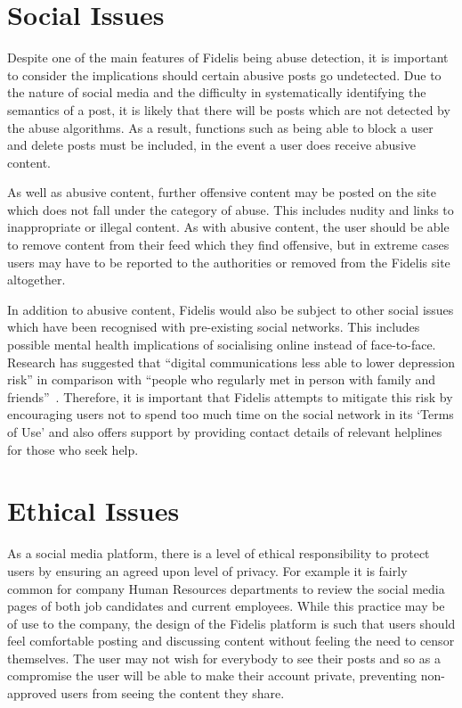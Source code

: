 \section{Social Issues}
Despite one of the main features of Fidelis being abuse detection, it is important to consider the implications should certain abusive posts go undetected. Due to the nature of social media and the difficulty in systematically identifying the semantics of a post, it is likely that there will be posts which are not detected by the abuse algorithms. As a result, functions such as being able to block a user and delete posts must be included, in the event a user does receive abusive content.

As well as abusive content, further offensive content may be posted on the site which does not fall under the category of abuse. This includes nudity and links to inappropriate or illegal content. As with abusive content, the user should be able to remove content from their feed which they find offensive, but in extreme cases users may have to be reported to the authorities or removed from the Fidelis site altogether.

In addition to abusive content, Fidelis would also be subject to other social issues which have been recognised with pre-existing social networks. This includes possible mental health implications of socialising online instead of face-to-face. Research has suggested that ``digital communications less able to lower depression risk'' in comparison with ``people who regularly met in person with family and friends''~\cite{OHSU:Depression}. Therefore, it is important that Fidelis attempts to mitigate this risk by encouraging users not to spend too much time on the social network in its `Terms of Use' and also offers support by providing contact details of relevant helplines for those who seek help.

\section{Ethical Issues}
As a social media platform, there is a level of ethical responsibility to protect users by ensuring an agreed upon level of privacy. For example it is fairly common for company Human Resources departments to review the social media pages of both job candidates and current employees. While this practice may be of use to the company, the design of the Fidelis platform is such that users should feel comfortable posting and discussing content without feeling the need to censor themselves. The user may not wish for everybody to see their posts and so as a compromise the user will be able to make their account private, preventing non-approved users from seeing the content they share.

